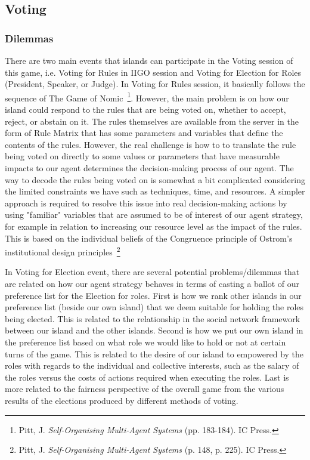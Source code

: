 \subsection{Voting} \label{subsec:Team6_Voting}
\subsubsection{Dilemmas} \label{subsubsec:Team6_Voting:Dilemma}
There are two main events that islands can participate in the Voting session of this game, i.e. Voting for Rules in IIGO session and Voting for Election for Roles (President, Speaker, or Judge). In Voting for Rules session, it basically follows the sequence of The Game of Nomic~\footnote{Pitt, J. \textit{Self-Organising Multi-Agent Systems} (pp. 183-184). IC Press.}. However, the main problem is on how our island could respond to the rules that are being voted on, whether to accept, reject, or abstain on it. The rules themselves are available from the server in the form of Rule Matrix that has some parameters and variables that define the contents of the rules. However, the real challenge is how to to translate the rule being voted on directly to some values or parameters that have measurable impacts to our agent determines the decision-making process of our agent. The way to decode the rules being voted on is somewhat a bit complicated considering the limited constraints we have such as techniques, time, and resources. A simpler approach is required to resolve this issue into real decision-making actions by using "familiar" variables that are assumed to be of interest of our agent strategy, for example in relation to increasing our resource level as the impact of the rules. This is based on the individual beliefs of the Congruence principle of Ostrom's institutional design principles~\footnote{Pitt, J. \textit{Self-Organising Multi-Agent Systems} (p. 148, p. 225). IC Press.}

In Voting for Election event, there are several potential problems/dilemmas that are related on how our agent strategy behaves in terms of casting a ballot of our preference list for the Election for roles. First is how we rank other islands in our preference list (beside our own island) that we deem suitable for holding the roles being elected. This is related to the relationship in the social network framework between our island and the other islands. Second is how we put our own island in the preference list based on what role we would like to hold or not at certain turns of the game. This is related to the desire of our island to empowered by the roles with regards to the individual and collective interests, such as the salary of the roles versus the costs of actions required when executing the roles. Last is more related to the fairness perspective of the overall game from the various results of the elections produced by different methods of voting.

